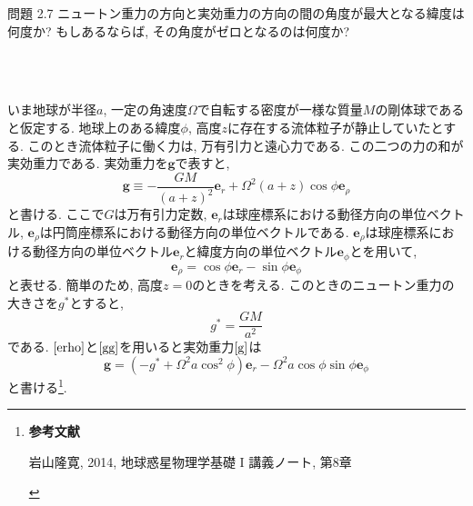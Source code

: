 \documentclass[a4j,12pt,openbib,oneside,dvipdfmx]{jreport}
\def\theequation{\arabic{chapter}.\arabic{equation}}
\def\thepage{\arabic{page}}
\begin{document}



\setcounter{equation}{0}
\def\theequation{\arabic{equation}}
\setcounter{equation}{0}
\renewcommand{\thepage}{207-\arabic{page}}
\setcounter{page}{1}

\begin{itembox}[l]{問題 2.7}
ニュートン重力の方向と実効重力の方向の間の角度が最大となる緯度は何度か? もしあるならば, その角度がゼロとなるのは何度か?
\end{itembox}
\\
\\
\par
いま地球が半径$a$, 一定の角速度$\Omega$で自転する密度が一様な質量$M$の剛体球であると仮定する. 地球上のある緯度$\phi$, 高度$z$に存在する流体粒子が静止していたとする. 
このとき流体粒子に働く力は, 万有引力と遠心力である. この二つの力の和が実効重力である. 実効重力を$\bm{g}$で表すと,
\begin{equation}
  \bm{g}\equiv-\frac{GM}{(a+z)^2}\bm{e}_r+{\Omega}^2{(a+z)}\cos{\phi}\bm{e}_\rho \label{g}
\end{equation}
と書ける. ここで$G$は万有引力定数, $\bm{e}_r$は球座標系における動径方向の単位ベクトル, $\bm{e}_\rho$は円筒座標系における動径方向の単位ベクトルである. $\bm{e}_\rho$は球座標系における動径方向の単位ベクトル$\bm{e}_r$と緯度方向の単位ベクトル$\bm{e}_\phi$とを用いて,
\begin{equation}
  \bm{e}_\rho=\cos{\phi}\bm{e}_r-\sin{\phi}\bm{e}_\phi \label{erho}
\end{equation}
と表せる. 簡単のため, 高度$z=0$のときを考える. このときのニュートン重力の大きさを$g^*$とすると, 
\begin{equation}
  g^*=\frac{GM}{a^2} \label{gg}
\end{equation}
である. $\eqref{erho}$と$\eqref{gg}$を用いると実効重力$\eqref{g}$は
\begin{equation}
  \bm{g}=(-g^*+{\Omega^2}a\cos^2{\phi})\bm{e}_r-{\Omega^2}a\cos{\phi}\sin{\phi}\bm{e}_\phi \label{gj}
\end{equation}
と書ける\footnote{
{\bfseries 参考文献}
\begin{description}
  \item {岩山隆寛, 2014, 地球惑星物理学基礎 I 講義ノート, 第8章}
\end{description}
}.
\end{document}
